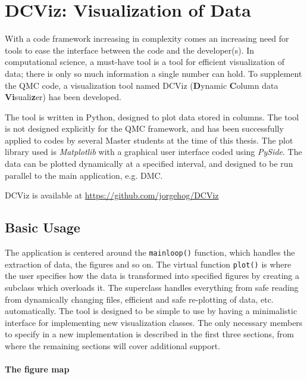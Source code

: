 \chapter{DCViz: Visualization of Data}
\label{appendix:DCVIZ}

With a code framework increasing in complexity comes an increasing need for tools to ease the interface between the code and the developer(s). In computational science, a must-have tool is a tool for efficient visualization of data; there is only so much information a single number can hold. To supplement the QMC code, a visualization tool named DCViz (\textbf{D}ynamic \textbf{C}olumn data \textbf{Vi}suali\textbf{z}er) has been developed.

The tool is written in Python, designed to plot data stored in columns. The tool is not designed explicitly for the QMC framework, and has been successfully applied to codes by several Master students at the time of this thesis. The plot library used is \textit{Matplotlib}\cite{Matplotlib} with a graphical user interface coded using \textit{PySide}\cite{Pyside}. The data can be plotted dynamically at a specified interval, and designed to be run parallel to the main application, e.g. DMC.

DCViz is available at \url{https://github.com/jorgehog/DCViz}

\section{Basic Usage}

The application is centered around the \verb+mainloop()+ function, which handles the extraction of data, the figures and so on. The virtual function \verb+plot()+ is where the user specifies how the data is transformed into specified figures by creating a subclass which overloads it. The superclass handles everything from safe reading from dynamically changing files, efficient and safe re-plotting of data, etc. automatically. The tool is designed to be simple to use by having a minimalistic interface for implementing new visualization classes. The only necessary members to specify in a new implementation is described in the first three sections, from where the remaining sections will cover additional support. 

\subsubsection{The figure map}

